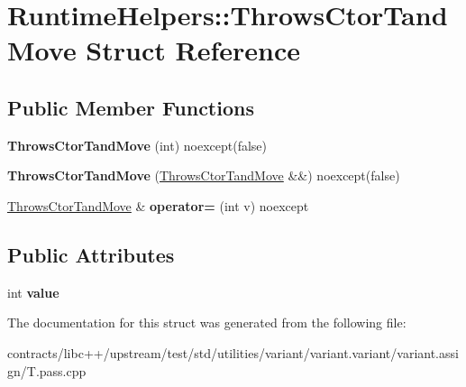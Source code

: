 \hypertarget{struct_runtime_helpers_1_1_throws_ctor_tand_move}{}\section{Runtime\+Helpers\+:\+:Throws\+Ctor\+Tand\+Move Struct Reference}
\label{struct_runtime_helpers_1_1_throws_ctor_tand_move}
\subsection*{Public Member Functions}
\begin{DoxyCompactItemize}
\item 
\mbox{\label{struct_runtime_helpers_1_1_throws_ctor_tand_move_ab706eb6c2f2488597251db9afeeb07bc}} 
{\bfseries Throws\+Ctor\+Tand\+Move} (int) noexcept(false)
\item 
\mbox{\label{struct_runtime_helpers_1_1_throws_ctor_tand_move_a89c412169abdc48c110eb6b83871bf58}} 
{\bfseries Throws\+Ctor\+Tand\+Move} (\mbox{\hyperlink{struct_runtime_helpers_1_1_throws_ctor_tand_move}{Throws\+Ctor\+Tand\+Move}} \&\&) noexcept(false)
\item 
\mbox{\label{struct_runtime_helpers_1_1_throws_ctor_tand_move_ad83f982569be1e8cd7d805bc9675c22d}} 
\mbox{\hyperlink{struct_runtime_helpers_1_1_throws_ctor_tand_move}{Throws\+Ctor\+Tand\+Move}} \& {\bfseries operator=} (int v) noexcept
\end{DoxyCompactItemize}
\subsection*{Public Attributes}
\begin{DoxyCompactItemize}
\item 
\mbox{\label{struct_runtime_helpers_1_1_throws_ctor_tand_move_a98e760a58f1b3a4ff2702bb034ca027a}} 
int {\bfseries value}
\end{DoxyCompactItemize}


The documentation for this struct was generated from the following file\+:\begin{DoxyCompactItemize}
\item 
contracts/libc++/upstream/test/std/utilities/variant/variant.\+variant/variant.\+assign/T.\+pass.\+cpp\end{DoxyCompactItemize}
